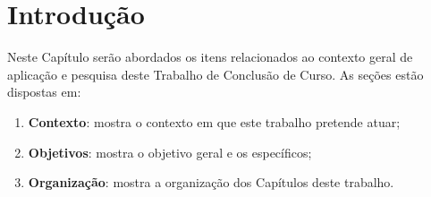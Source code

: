 \chapter*[Introdução]{Introdução}
\label{chap:intro}

Neste Capítulo serão abordados os itens relacionados ao contexto geral de
aplicação e pesquisa deste Trabalho de Conclusão de Curso. As seções estão
dispostas em:

\begin{enumerate}
  \item \textbf{Contexto}: mostra o contexto em que este trabalho pretende
    atuar;
  \item \textbf{Objetivos}: mostra o objetivo geral e os específicos;
  \item \textbf{Organização}: mostra a organização dos Capítulos deste
    trabalho.
\end{enumerate}





